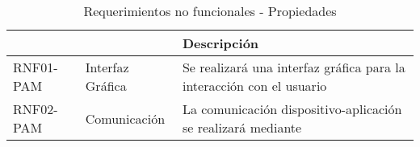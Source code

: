 \begin{center}
\begin{table}[!htb]
\centering
\begin{tabular}{|p{4cm}|p{4cm}|p{5cm}|}
    \hline
    \centering {\bfseries }  & \centering {\bfseries Nombre} & {\bfseries Descripción} \\ \hline
    \centering RNF01-PAM & \centering Interfaz Gráfica & Se realizará una interfaz gráfica para la interacción con el usuario \\ \hline 
    \centering RNF02-PAM &  \centering Comunicación & La comunicación dispositivo-aplicación se realizará mediante \\
    \hline
\end{tabular}
\caption{Requerimientos no funcionales - Propiedades}
\label{tabla:pobconlimsincolo}
\end{table}
\end{center}

